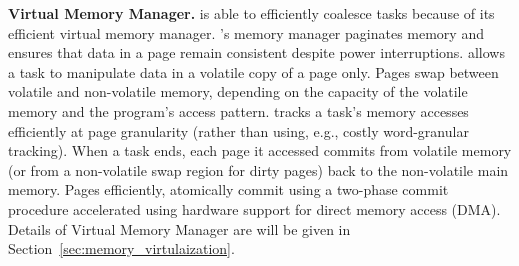 \textbf{\sys Virtual Memory Manager.} \sys is able to efficiently coalesce tasks because of its efficient virtual memory manager. \sys's memory manager paginates memory and ensures that data in a page remain consistent despite power interruptions. \sys allows a task to manipulate data in a volatile copy of a page only. Pages swap between volatile and non-volatile memory, depending on the capacity of the volatile memory and the program's access pattern. \sys tracks a task's memory accesses efficiently at page granularity (rather than using, e.g., costly word-granular tracking). When a task ends, each page it accessed commits from volatile memory (or from a non-volatile swap region for dirty pages) back to the non-volatile main memory. Pages efficiently, atomically commit using a two-phase commit procedure accelerated using hardware support for direct memory access (DMA). Details of Virtual Memory Manager are will be given in Section~\ref{sec:memory_virtulaization}.